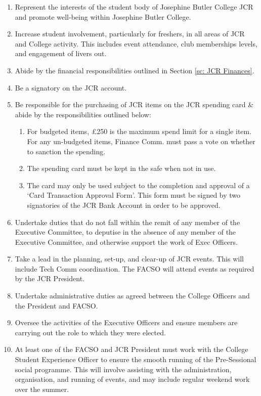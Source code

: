 \begin{enumerate}
    \item Represent the interests of the student body of Josephine Butler College JCR and promote well-being within Josephine Butler College.
    \item Increase student involvement, particularly for freshers, in all areas of JCR and College activity. This includes event attendance, club memberships levels, and engagement of livers out.
    \item Abide by the financial responsibilities outlined in Section \ref{sc: JCR Finances}.
    \item Be a signatory on the JCR account.
    \item Be responsible for the purchasing of JCR items on the JCR spending card & abide by the responsibilities outlined below:
    \begin{enumerate}
        \item For budgeted items, £250 is the maximum spend limit for a single item. For any un-budgeted items, Finance Comm. must pass a vote on whether to sanction the spending.
        \item The spending card must be kept in the safe when not in use.
        \item The card may only be used subject to the completion and approval of a ‘Card Transaction Approval Form’. This form must be signed by two signatories of the JCR Bank Account in order to be approved.
    \end{enumerate}
    \item Undertake duties that do not fall within the remit of any member of the Executive Committee, to deputise in the absence of any member of the Executive Committee, and otherwise support the work of Exec Officers. 
    \item Take a lead in the planning, set-up, and clear-up of JCR events. This will include Tech Comm coordination. The FACSO will attend events as required by the JCR President.
    \item Undertake administrative duties as agreed between the College Officers and the President and FACSO. 
    \item Oversee the activities of the Executive Officers and ensure members are carrying out the role to which they were elected.
    \item At least one of the FACSO and JCR President must work with the College Student Experience Officer to ensure the smooth running of the Pre-Sessional social programme. This will involve assisting with the administration, organisation, and running of events, and may include regular weekend work over the summer.

\end{enumerate}
